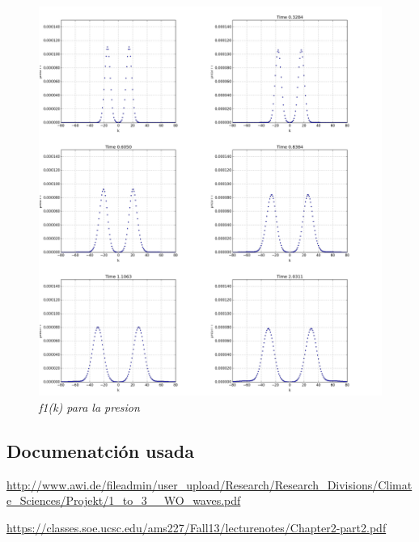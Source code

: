 \documentclass{article}
\begin{document}
\begin{figure}[!ht]
 \centering
 \includegraphics[scale=0.2]{fourinhom2.png}
 \caption{\emph{f1(k) para la presion}}
\end{figure}

\newpage 
\subsection{Documenatción usada}
\begin{description}
\item \href{http://www.awi.de/fileadmin/user\_upload/Research/Research\_Divisions/Climate\_Sciences/Projekt/1\_to\_3\_\_WO\_waves.pdf}{http://www.awi.de/fileadmin/user\_upload/Research/Research\_Divisions/Climate\_Sciences/Projekt/1\_to\_3\_\_WO\_waves.pdf}
\item \href{https://classes.soe.ucsc.edu/ams227/Fall13/lecturenotes/Chapter2-part2.pdf}{https://classes.soe.ucsc.edu/ams227/Fall13/lecturenotes/Chapter2-part2.pdf}
\end{description}
\end{document}
